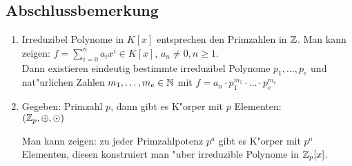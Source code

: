 \subsection{Abschlussbemerkung}
\begin{enumerate}
	\item
	Irreduzibel Polynome in $K[x]$ entsprechen den Primzahlen in $\mathbb{Z}$. Man kann zeigen:
	$f = \sum_{i=0}^{n} a_i x^i \in K[x]$, $a_n \neq 0, n \geq 1$.\\
	Dann existieren eindeutig bestimmte irreduzibel Polynome $p_1, \dots, p_e$ und nat"urlichen Zahlen $m_1, \dots , m_e \in \mathbb{N}$ mit $f= a_n \cdot p_1^{m_1} \cdot \ldots \cdot p_e^{m_e}$
	\item
	Gegeben: Primzahl $p$, dann gibt es K"orper mit $p$ Elementen:\\
	$(\mathbb{Z}_p, \oplus, \odot)$
	
	Man kann zeigen: zu jeder Primzahlpotenz $p^a$ gibt es K"orper mit $p^a$ Elementen, diesen konstruiert man "uber irreduzible Polynome in $\mathbb{Z}_p[x]$. 
\end{enumerate}
